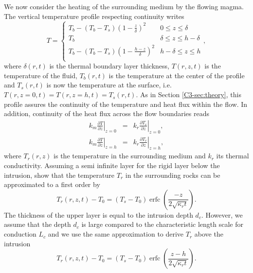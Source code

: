 We now consider  the heating of the surrounding medium  by the flowing
magma.  The vertical temperature profile respecting continuity writes
\begin{equation}
  T=
  \begin{cases}
    T_b - (T_b-T_s)(1-\frac{z}{\delta})^2 & 0 \le z\le \delta \\
    T_b & \delta \le z\le h-\delta \\
    T_b - (T_b-T_s)(1-\frac{h-z}{\delta})^2 & h-\delta \le z\le h\\
  \end{cases},
  \label{C4-Temperature}
\end{equation}
where  $\delta(r,t)$   is  the   thermal  boundary   layer  thickness,
$T(r,z,t)$  is  the  temperature  of  the  fluid,  $T_b(r,t)$  is  the
temperature at  the center of  the profile  and $T_s(r,t)$ is  now the
temperature  at the  surface, i.e.   $T(r,z=0,t)=T(r,z=h,t)=T_s(r,t)$.
As in Section \ref{C3-sec:theory}, this profile assures the continuity
of  the temperature  and  heat  flux within  the  flow.  In  addition,
continuity of the heat flux across the flow boundaries reads
\begin{eqnarray}
  k_m\left.\frac{\partial                                    T}{\partial
  z}\right|_{z=0}&=&k_r\left.\frac{\partial              T_r}{\partial
                     z}\right|_{z=0}  ,\label{C4-Flux1}\\
  k_m\left.\frac{\partial                                  T}{\partial
  z}\right|_{z=h}&=&k_r\left.\frac{\partial            T_r}{\partial
                     z}\right|_{z=h},
                     \label{C4-Flux2}
\end{eqnarray}
where  $T_r(r,z)$ is  the temperature  in the  surrounding medium  and
$k_r$ its  thermal conductivity.  Assuming  a semi infinite  layer for
the rigid layer below  the intrusion, \citet{Carslaw:1959wf} show that
the temperature $T_r$ in the  surrounding rocks can be approximated to
a first order by
\begin{equation}
  T_r(r,z,t)-T_0=(T_{s}-T_0)\operatorname{erfc}{\left(\frac{-z}{2\sqrt{\kappa_r t}}\right)}.
  \label{C4-eq22}
\end{equation}
The  thickness of  the upper  layer is  equal to  the intrusion  depth
$d_c$. However,  we assume that the  depth $d_c$ is large  compared to
the characteristic  length scale for  conduction $L_c$ and we  use the
same approximation to derive $T_r$ above the intrusion
\begin{equation}
  T_r(r,z,t)-T_0=(T_{s}-T_0)\operatorname{erfc}{\left(\frac{z-h}{2\sqrt{\kappa_r t}}\right)}.
  \label{C4-eq11}
\end{equation}
